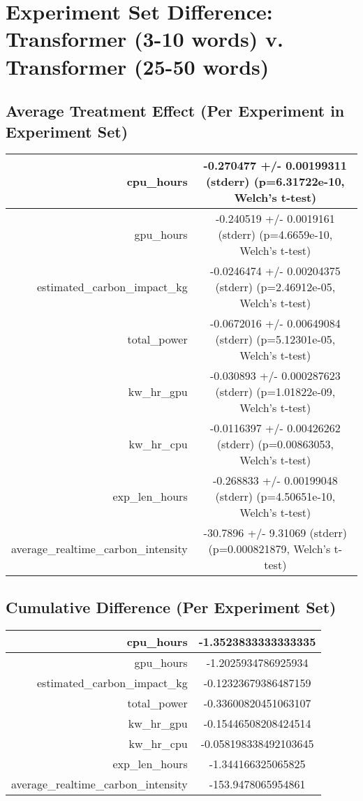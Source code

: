 \documentclass{article}%
\begin{document}
%
\normalsize%
\section{Experiment Set Difference: Transformer (3{-}10 words) v. Transformer (25{-}50 words)}%
\label{sec:Experiment Set Difference Transformer (3{-}10 words) v. Transformer (25{-}50 words)}%
\subsection{Average Treatment Effect (Per Experiment in Experiment Set)}%
\label{subsec:Average Treatment Effect (Per Experiment in Experiment Set)}%
\begin{tabular}{|r|c|}%
\hline%
cpu\_hours&{-}0.270477 +/{-} 0.00199311 (stderr) (p=6.31722e{-}10, Welch's t{-}test)\\%
\hline%
gpu\_hours&{-}0.240519 +/{-} 0.0019161 (stderr) (p=4.6659e{-}10, Welch's t{-}test)\\%
\hline%
estimated\_carbon\_impact\_kg&{-}0.0246474 +/{-} 0.00204375 (stderr) (p=2.46912e{-}05, Welch's t{-}test)\\%
\hline%
total\_power&{-}0.0672016 +/{-} 0.00649084 (stderr) (p=5.12301e{-}05, Welch's t{-}test)\\%
\hline%
kw\_hr\_gpu&{-}0.030893 +/{-} 0.000287623 (stderr) (p=1.01822e{-}09, Welch's t{-}test)\\%
\hline%
kw\_hr\_cpu&{-}0.0116397 +/{-} 0.00426262 (stderr) (p=0.00863053, Welch's t{-}test)\\%
\hline%
exp\_len\_hours&{-}0.268833 +/{-} 0.00199048 (stderr) (p=4.50651e{-}10, Welch's t{-}test)\\%
\hline%
average\_realtime\_carbon\_intensity&{-}30.7896 +/{-} 9.31069 (stderr) (p=0.000821879, Welch's t{-}test)\\%
\hline%
\end{tabular}

%
\subsection{Cumulative Difference (Per Experiment Set)}%
\label{subsec:Cumulative Difference (Per Experiment Set)}%
\begin{tabular}{|r|c|}%
\hline%
cpu\_hours&{-}1.3523833333333335\\%
\hline%
gpu\_hours&{-}1.2025934786925934\\%
\hline%
estimated\_carbon\_impact\_kg&{-}0.12323679386487159\\%
\hline%
total\_power&{-}0.33600820451063107\\%
\hline%
kw\_hr\_gpu&{-}0.15446508208424514\\%
\hline%
kw\_hr\_cpu&{-}0.058198338492103645\\%
\hline%
exp\_len\_hours&{-}1.344166325065825\\%
\hline%
average\_realtime\_carbon\_intensity&{-}153.9478065954861\\%
\hline%
\end{tabular}

%
\end{document}
